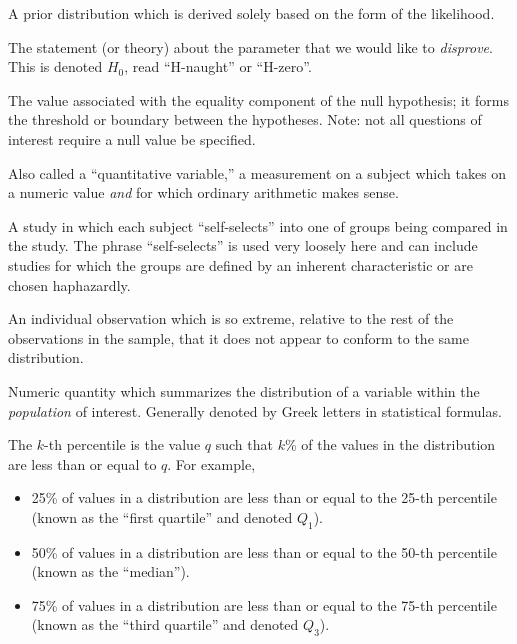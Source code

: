 \documentclass[
  letterpaper,
  DIV=11,
  numbers=noendperiod]{scrreprt}
\providecommand{\tightlist}{%
  \setlength{\itemsep}{0pt}\setlength{\parskip}{0pt}}\usepackage{longtable,booktabs,array}
\theoremstyle{definition}
\theoremstyle{plain}
\theoremstyle{definition}
\theoremstyle{remark}
\begin{document}
\begin{description}
\tightlist
\item[Noninformative Prior (Definition~\ref{def-noninformative-prior})]
A prior distribution which is derived solely based on the form of the
likelihood.
\item[Null Hypothesis (Definition~\ref{def-null-hypothesis})]
The statement (or theory) about the parameter that we would like to
\emph{disprove}. This is denoted \(H_0\), read ``H-naught'' or
``H-zero''.
\item[Null Value (Definition~\ref{def-null-value})]
The value associated with the equality component of the null hypothesis;
it forms the threshold or boundary between the hypotheses. Note: not all
questions of interest require a null value be specified.
\item[Numeric Variable (Definition~\ref{def-numeric})]
Also called a ``quantitative variable,'' a measurement on a subject
which takes on a numeric value \emph{and} for which ordinary arithmetic
makes sense.
\item[Observational Study (Definition~\ref{def-observational-study})]
A study in which each subject ``self-selects'' into one of groups being
compared in the study. The phrase ``self-selects'' is used very loosely
here and can include studies for which the groups are defined by an
inherent characteristic or are chosen haphazardly.
\item[Outlier (Definition~\ref{def-outlier})]
An individual observation which is so extreme, relative to the rest of
the observations in the sample, that it does not appear to conform to
the same distribution.
\item[Parameter (Definition~\ref{def-parameter})]
Numeric quantity which summarizes the distribution of a variable within
the \emph{population} of interest. Generally denoted by Greek letters in
statistical formulas.
\item[Percentile (Definition~\ref{def-percentile})]
The \(k\)-th percentile is the value \(q\) such that \(k\)\% of the
values in the distribution are less than or equal to \(q\). For example,
\end{description}

\begin{itemize}
\tightlist
\item
  25\% of values in a distribution are less than or equal to the 25-th
  percentile (known as the ``first quartile'' and denoted \(Q_1\)).
\item
  50\% of values in a distribution are less than or equal to the 50-th
  percentile (known as the ``median'').
\item
  75\% of values in a distribution are less than or equal to the 75-th
  percentile (known as the ``third quartile'' and denoted \(Q_3\)).
\end{itemize}
\end{document}
